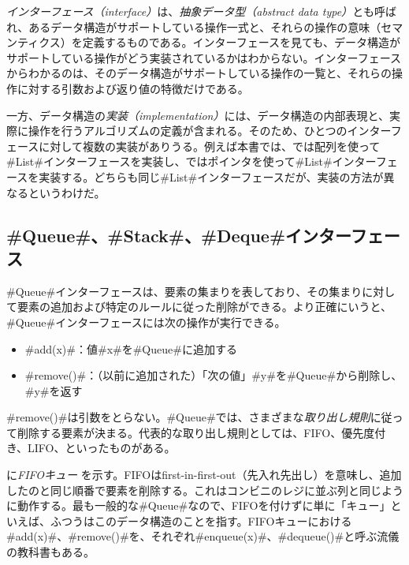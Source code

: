 \emph{インターフェース（interface）}は、\emph{抽象データ型（abstract data type）}とも呼ばれ、あるデータ構造がサポートしている操作一式と、それらの操作の意味（セマンティクス）を定義するものである。インターフェースを見ても、データ構造がサポートしている操作がどう実装されているかはわからない。インターフェースからわかるのは、そのデータ構造がサポートしている操作の一覧と、それらの操作に対する引数および返り値の特徴だけである。 %

一方、データ構造の\emph{実装（implementation）}には、データ構造の内部表現と、実際に操作を行うアルゴリズムの定義が含まれる。そのため、ひとつのインターフェースに対して複数の実装がありうる。例えば本書では、では配列を使って#List#インターフェースを実装し、ではポインタを使って#List#インターフェースを実装する。どちらも同じ#List#インターフェースだが、実装の方法が異なるというわけだ。

\subsection{#Queue#、#Stack#、#Deque#インターフェース}

#Queue#インターフェースは、要素の集まりを表しており、その集まりに対して要素の追加および特定のルールに従った削除ができる。より正確にいうと、#Queue#インターフェースには次の操作が実行できる。

\begin{itemize}
  \item #add(x)#：値#x#を#Queue#に追加する
  \item #remove()#：（以前に追加された）「次の値」#y#を#Queue#から削除し、#y#を返す
\end{itemize}

#remove()#は引数をとらない。#Queue#では、さまざまな\emph{取り出し規則}に従って削除する要素が決まる。代表的な取り出し規則としては、FIFO、優先度付き、LIFO、といったものがある。 %

に\emph{FIFOキュー} を示す。FIFOはfirst-in-first-out（先入れ先出し）を意味し、追加したのと同じ順番で要素を削除する。これはコンビニのレジに並ぶ列と同じように動作する。最も一般的な#Queue#なので、FIFOを付けずに単に「キュー」といえば、ふつうはこのデータ構造のことを指す。FIFOキューにおける#add(x)#、#remove()#を、それぞれ#enqueue(x)#、#dequeue()#と呼ぶ流儀の教科書もある。

